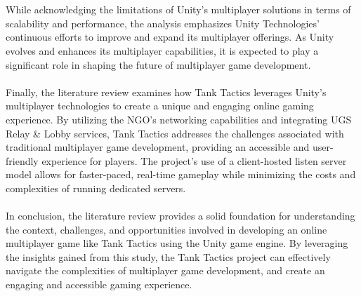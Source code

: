 \\
\noindent
\\
While acknowledging the limitations of Unity's multiplayer solutions in terms of scalability and performance, the analysis emphasizes Unity Technologies' continuous efforts to improve and expand its multiplayer offerings. As Unity evolves and enhances its multiplayer capabilities, it is expected to play a significant role in shaping the future of multiplayer game development.
\\
\noindent
\\
Finally, the literature review examines how Tank Tactics leverages Unity's multiplayer technologies to create a unique and engaging online gaming experience. By utilizing the NGO's networking capabilities and integrating UGS Relay \& Lobby services, Tank Tactics addresses the challenges associated with traditional multiplayer game development, providing an accessible and user-friendly experience for players. The project's use of a client-hosted listen server model allows for faster-paced, real-time gameplay while minimizing the costs and complexities of running dedicated servers.
\\
\noindent
\\
In conclusion, the literature review provides a solid foundation for understanding the context, challenges, and opportunities involved in developing an online multiplayer game like Tank Tactics using the Unity game engine. By leveraging the insights gained from this study, the Tank Tactics project can effectively navigate the complexities of multiplayer game development, and create an engaging and accessible gaming experience.